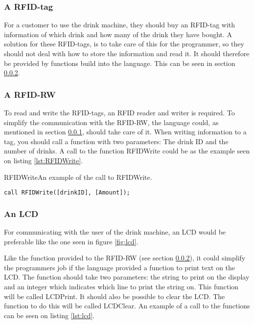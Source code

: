 \subsubsection{A RFID-tag}
\label{sec:RFIDtag}
For a customer to use the drink machine, they should buy an RFID-tag with information of which drink and how many of the drink they have bought. A solution for these RFID-tags, is to take care of this for the programmer, so they should not deal with how to store the information and read it. It should therefore be provided by functions build into the language. This can be seen in section \ref{sec:RFIDRW}.

\subsubsection{A RFID-RW}
\label{sec:RFIDRW}
To read and write the RFID-tags, an RFID reader and writer is required. To simplify the communication with the RFID-RW, the language could, as mentioned in section \ref{sec:RFIDtag}, should take care of it. When writing information to a tag, you should call a function with two parameters: The drink ID and the number of drinks. A call to the function RFIDWrite could be as the example seen on listing \ref{lst:RFIDWrite}.

\begin{code}{RFIDWrite}{An example of the call to RFIDWrite.}
\begin{lstlisting}[mathescape]
call RFIDWrite([drinkID], [Amount]);
\end{lstlisting}
\end{code}

\subsubsection{An LCD}
For communicating with the user of the drink machine, an LCD would be preferable like the one seen in figure \ref{fig:lcd}.


Like the function provided to the RFID-RW (see section \ref{sec:RFIDRW}), it could simplify the programmers job if the language provided a function to print text on the LCD. The function should take two parameters: the string to print on the display and an integer which indicates which line to print the string on. This function will be called LCDPrint. It should also be possible to clear the LCD. The function to do this will be called LCDClear. An example of a call to the functions can be seen on listing \ref{lst:lcd}.

